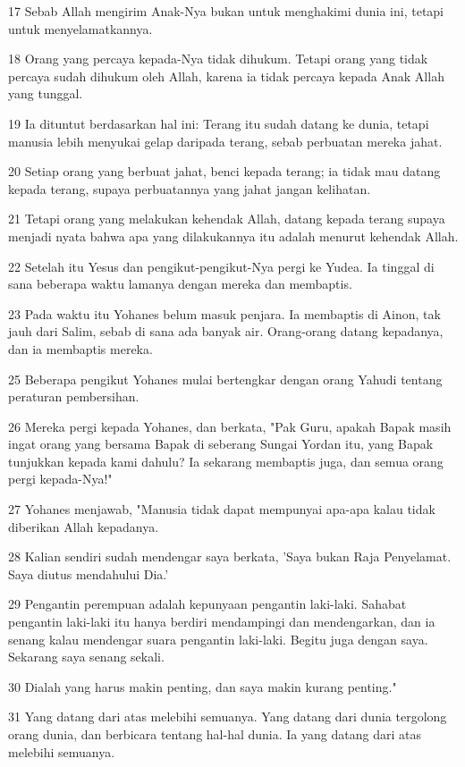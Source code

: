 \par 17 Sebab Allah mengirim Anak-Nya bukan untuk menghakimi dunia ini, tetapi untuk menyelamatkannya.
\par 18 Orang yang percaya kepada-Nya tidak dihukum. Tetapi orang yang tidak percaya sudah dihukum oleh Allah, karena ia tidak percaya kepada Anak Allah yang tunggal.
\par 19 Ia dituntut berdasarkan hal ini: Terang itu sudah datang ke dunia, tetapi manusia lebih menyukai gelap daripada terang, sebab perbuatan mereka jahat.
\par 20 Setiap orang yang berbuat jahat, benci kepada terang; ia tidak mau datang kepada terang, supaya perbuatannya yang jahat jangan kelihatan.
\par 21 Tetapi orang yang melakukan kehendak Allah, datang kepada terang supaya menjadi nyata bahwa apa yang dilakukannya itu adalah menurut kehendak Allah.
\par 22 Setelah itu Yesus dan pengikut-pengikut-Nya pergi ke Yudea. Ia tinggal di sana beberapa waktu lamanya dengan mereka dan membaptis.
\par 23 Pada waktu itu Yohanes belum masuk penjara. Ia membaptis di Ainon, tak jauh dari Salim, sebab di sana ada banyak air. Orang-orang datang kepadanya, dan ia membaptis mereka.
\par 25 Beberapa pengikut Yohanes mulai bertengkar dengan orang Yahudi tentang peraturan pembersihan.
\par 26 Mereka pergi kepada Yohanes, dan berkata, "Pak Guru, apakah Bapak masih ingat orang yang bersama Bapak di seberang Sungai Yordan itu, yang Bapak tunjukkan kepada kami dahulu? Ia sekarang membaptis juga, dan semua orang pergi kepada-Nya!"
\par 27 Yohanes menjawab, "Manusia tidak dapat mempunyai apa-apa kalau tidak diberikan Allah kepadanya.
\par 28 Kalian sendiri sudah mendengar saya berkata, 'Saya bukan Raja Penyelamat. Saya diutus mendahului Dia.'
\par 29 Pengantin perempuan adalah kepunyaan pengantin laki-laki. Sahabat pengantin laki-laki itu hanya berdiri mendampingi dan mendengarkan, dan ia senang kalau mendengar suara pengantin laki-laki. Begitu juga dengan saya. Sekarang saya senang sekali.
\par 30 Dialah yang harus makin penting, dan saya makin kurang penting."
\par 31 Yang datang dari atas melebihi semuanya. Yang datang dari dunia tergolong orang dunia, dan berbicara tentang hal-hal dunia. Ia yang datang dari atas melebihi semuanya.
